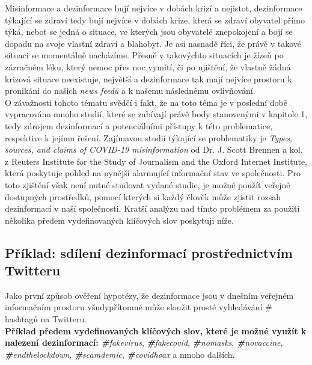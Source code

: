 Misinformace a dezinformace bují nejvíce v dobách krizí a nejistot, dezinformace týkající se zdraví tedy bují nejvíce v dobách krize, která se zdraví obyvatel přímo týká, neboť se jedná o situace, ve kterých jsou obyvatelé znepokojení a bojí se dopadu na svoje vlastní zdraví a blahobyt. Je asi nasnadě říci, že právě v takové situaci se momentálně nacházíme. Přesně v takovýchto situacích je žízeň po zázračném léku, který nemoc přes noc vymítí, či po ujištění, že vlastně žádná krizová situace neexistuje, největší a dezinformace tak mají nejvíce prostoru k pronikání do našich \textit{news feedů} a k našemu následnému ovlivňování.\\

O závažnosti tohoto tématu svědčí i fakt, že na toto téma je v poslední době vypracováno mnoho studií, které se zabívají právě body stanovenými v kapitole 1, tedy zdrojem dezinformací a potenciálními přístupy k této problematice, respektive k jejímu řešení. Zajímavou studií týkající se problematiky je \textit{Types, sources, and claims of COVID-19 misinformation} od Dr. J. Scott Brennen a kol. z Reuters Institute for the Study of Journalism and the Oxford Internet Institute\cite{noauthor_types_nodate}, která poskytuje pohled na nynější alarmující informační stav ve společnosti. Pro toto zjištění však není nutné studovat vydané studie, je možné použít veřejně dostupných prostředků, pomocí kterých si každý člověk může zjistit rozsah dezinformací v naší společnosti. Kratší analýzu nad tímto problémem za použití několika předem vydefinovaných klíčových slov poskytuji níže.\\

\subsection{Příklad: sdílení dezinformací prostřednictvím Twitteru}

Jako první způsob ověření hypotézy, že dezinformace jsou v dnešním veřejném informačním prostoru všudypřítomné může sloužit prosté vyhledávání \# hashtagů na Twitteru.\\

\textbf{Příklad předem vydefinovaných klíčových slov, které je možné využít k nalezení dezinformací:} \textit{\textbf{\#}fakevirus}, \textit{\textbf{\#}fakecovid}, \textit{\textbf{\#}nomasks}, \textit{\textbf{\#}novaccine}, \textit{\textbf{\#}endthelockdown}, \textit{\textbf{\#}scamdemic}, \textit{\textbf{\#}covidhoax} a mnoho dalších.\\

